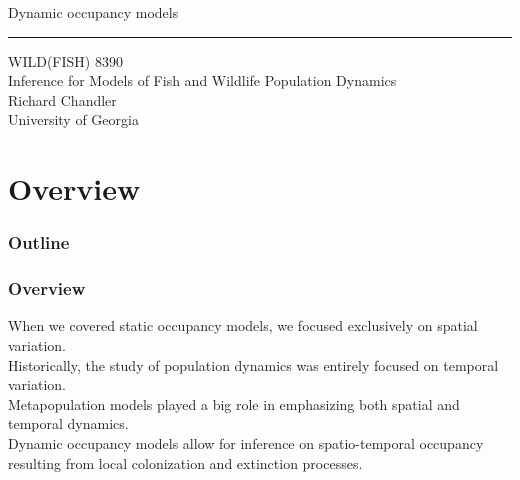 \documentclass[color=usenames,dvipsnames]{beamer}\usepackage[]{graphicx}\usepackage[]{xcolor}
\begin{document}
\begin{frame}[plain]
  \LARGE
  \centering
  {\huge %
    Dynamic occupancy models} \\
  {\color{default} \rule{\textwidth}{0.1pt}}
  \vfill
  \large
  WILD(FISH) 8390 \\
  Inference for Models of Fish and Wildlife Population Dynamics \\
  \vfill
  Richard Chandler \\
  University of Georgia \\
\end{frame}






\section{Overview}



\begin{frame}[plain]
  \frametitle{Outline}
  \Large
\end{frame}



\begin{frame}
  \frametitle{Overview}
  When we covered static occupancy models, we focused exclusively on
  spatial variation. \\   
  \pause
  \vfill
  Historically, the study of population dynamics was entirely
  focused on temporal variation. \\
  \pause
  \vfill
  Metapopulation models played a big role in emphasizing both spatial
  and temporal dynamics. \\
  \pause
  \vfill
  Dynamic occupancy models allow for inference on spatio-temporal
  occupancy resulting from local colonization and extinction
  processes. \\
\end{frame}
\end{document}
